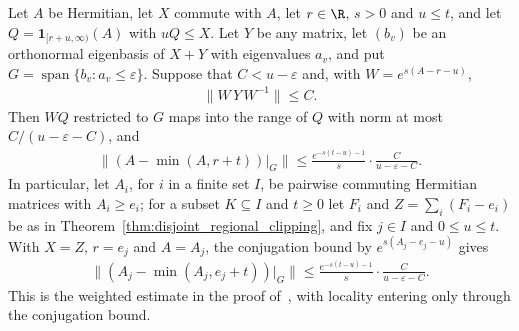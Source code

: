 \begin{theorem}
    \label{thm:regional_truncation_low_from_conjugation}
    \leanok
    Let $A$ be Hermitian, let $X$ commute with $A$, let $r\in\R$, $s>0$ and
    $u\le t$, and let $Q=\mathbf1_{[r+u,\infty)}(A)$ with $uQ\le X$. Let $Y$ be any
    matrix, let $(b_v)$ be an orthonormal eigenbasis of $X+Y$ with eigenvalues
    $a_v$, and put $G=\operatorname{span}\{b_v:a_v\le\varepsilon\}$. Suppose that
    $C<u-\varepsilon$ and, with $W=e^{s(A-r-u)}$,
    \begin{align}
        \bigl\lVert W\,Y\,W^{-1}\bigr\rVert\le C.
    \end{align}
    Then $WQ$ restricted to $G$ maps into the range of $Q$ with norm at most
    $C/(u-\varepsilon-C)$, and
    \begin{align}
        \bigl\lVert(A-\min(A,r+t))|_G\bigr\rVert
        \le\frac{e^{-s(t-u)-1}}{s}\cdot\frac{C}{u-\varepsilon-C}.
    \end{align}
    In particular, let $A_i$, for $i$ in a finite set $I$, be pairwise commuting
    Hermitian matrices with $A_i\ge e_i$; for a subset $K\subseteq I$ and $t\ge0$
    let $F_i$ and $Z=\sum_i(F_i-e_i)$ be as in
    Theorem~\ref{thm:disjoint_regional_clipping}, and fix $j\in I$ and $0\le u\le
    t$. With $X=Z$, $r=e_j$ and $A=A_j$, the conjugation bound by $e^{s(A_j-e_j-u)}$
    gives
    \begin{align}
        \bigl\lVert(A_j-\min(A_j,e_j+t))|_G\bigr\rVert
        \le\frac{e^{-s(t-u)-1}}{s}\cdot\frac{C}{u-\varepsilon-C}.
    \end{align}
    This is the weighted estimate in the proof
    of~\cite[Theorem~2.6]{Arad2014Connecting}, with locality entering only
    through the conjugation bound.
\end{theorem}
